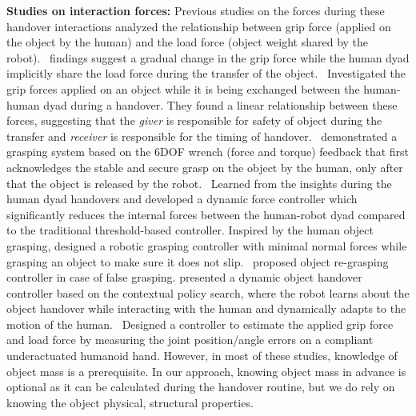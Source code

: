 \textbf{Studies on interaction forces:} Previous studies on the forces during these handover interactions analyzed the relationship between grip force (applied on the object by the human) and the load force (object weight shared by the robot).~\cite{mason2005grip} findings suggest a gradual change in the grip force while the human dyad implicitly share the load force during the transfer of the object.~\cite{chan2013human} Investigated the grip forces applied on an object while it is being exchanged between the human-human dyad during a handover. They found a linear relationship between these forces, suggesting that the \textit{giver} is responsible for safety of object during the transfer and \textit{receiver} is responsible for the timing of handover.~\cite{nagata1998delivery} demonstrated a grasping system based on the 6DOF wrench (force and torque) feedback that first acknowledges the stable and secure grasp on the object by the human, only after that the object is released by the robot.~\cite{medina2016human} Learned from the insights during the human dyad handovers and developed a dynamic force controller which significantly reduces the internal forces between the human-robot dyad compared to the traditional threshold-based controller. Inspired by the human object grasping, \cite{sadigh2009safe} designed a robotic grasping controller with minimal normal forces while grasping an object to make sure it does not slip.~\cite{parastegari2018failure} proposed object re-grasping controller in case of false grasping. \cite{kupcsik2016learning} presented a dynamic object handover controller based on the contextual policy search, where the robot learns about the object handover while interacting with the human and dynamically adapts to the motion of the human.~\cite{chan2014implementation} Designed a controller to estimate the applied grip force and load force by measuring the joint position/angle errors on a compliant underactuated humanoid hand. However, in most of these studies, knowledge of object mass is a prerequisite. In our approach, knowing object mass in advance is optional as it can be calculated during the handover routine, but we do rely on knowing the object physical, structural properties.


